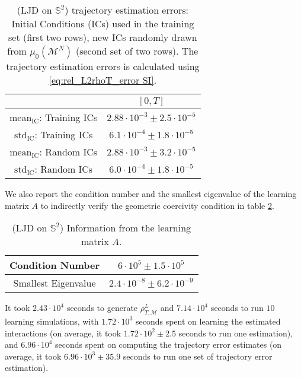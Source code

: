\documentclass[11pt]{article}
\newcommand{\mM}{\mathcal{M}}
\newcommand{\probIC}{\mu_0}
\newcommand{\muX}{\probIC(\mM^N)}
\begin{document}
\begin{table}[H]
\centering
\small{\begin{tabular}{| c || c |} 
\hline
                                        & $[0, T]$                                \\
\hline
$\text{mean}_{\text{IC}}$: Training ICs & $2.88 \cdot 10^{-3} \pm 2.5 \cdot 10^{-5}$ \\
\hline
$\text{std}_{\text{IC}}$:  Training ICs & $6.1 \cdot 10^{-4} \pm 1.8 \cdot 10^{-5}$ \\
\hline   
\hline         
$\text{mean}_{\text{IC}}$: Random ICs   & $2.88 \cdot 10^{-3} \pm 3.2 \cdot 10^{-5}$ \\
\hline
$\text{std}_{\text{IC}}$:  Random ICs   & $6.0 \cdot 10^{-4} \pm 1.8 \cdot 10^{-5}$ \\
\hline   
\end{tabular}}
\caption{(LJD on $\mathbb{S}^2$) trajectory estimation errors: Initial Conditions (ICs) used in the training set (first two rows), new ICs randomly drawn from $\muX$ (second set of two rows).  The trajectory estimation errors is calculated using \eqref{eq:rel_L2rhoT_error SI}.}
\label{tab:LJD_on_S2_traj_err}
\end{table}
We also report the condition number and the smallest eigenvalue of the learning matrix $A$ to indirectly verify the geometric coercivity condition in table \ref{tab:LJD_on_S2_coer}.
\begin{table}[H]
\centering
\small{\begin{tabular}{ c || c } 
Condition Number    & $6 \cdot 10^{5} \pm 1.5 \cdot 10^{5}$ \\ 
\hline
Smallest Eigenvalue & $2.4 \cdot 10^{-8} \pm 6.2 \cdot 10^{-9}$
\end{tabular}}
\caption{(LJD on $\mathbb{S}^2$) Information from the learning matrix $A$.}
\label{tab:LJD_on_S2_coer}
\end{table}
It took $2.43 \cdot 10^{4}$ seconds to generate $\rho_{T, \mM}^L$ and $7.14 \cdot 10^{4}$ seconds to run $10$ learning simulations, with $1.72 \cdot 10^{3}$ seconds spent on learning the estimated interactions (on average, it took $1.72 \cdot 10^{2} \pm 2.5$ seconds to run one estimation), and $6.96 \cdot 10^{4}$ seconds spent on computing the trajectory error estimates (on average, it took $6.96 \cdot 10^{3} \pm 35.9$ seconds to run one set of trajectory error estimation).
\end{document}
